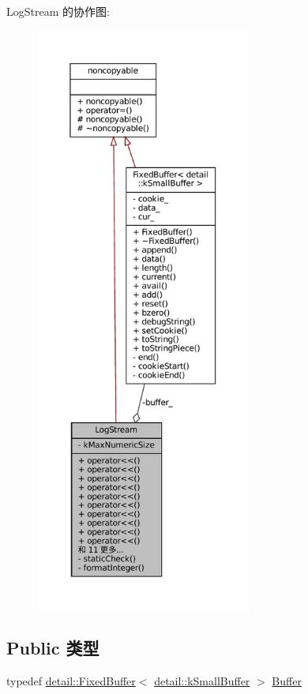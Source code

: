 Log\+Stream 的协作图\+:
\nopagebreak
\begin{figure}[H]
\begin{center}
\leavevmode
\includegraphics[height=550pt]{classmuduo_1_1LogStream__coll__graph}
\end{center}
\end{figure}
\subsection*{Public 类型}
\begin{DoxyCompactItemize}
\item 
typedef \hyperlink{classmuduo_1_1detail_1_1FixedBuffer}{detail\+::\+Fixed\+Buffer}$<$ \hyperlink{namespacemuduo_1_1detail_a01441c3dba82e5d4bad1ce2b39ff576b}{detail\+::k\+Small\+Buffer} $>$ \hyperlink{classmuduo_1_1LogStream_ad711cf53b5df9fac2d62ecd2b9a8f763}{Buffer}
\end{DoxyCompactItemize}

